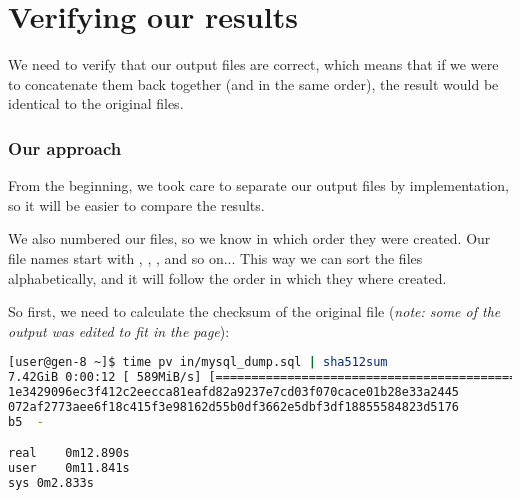 
\renewcommand{\currentPart}{Verifying our results} 

\newpage
\part{Verifying our results} \label{verify-results}

We need to verify that our output files are correct, which means that if we were to concatenate them back together (and in the same order), the result would be identical to the original files.


\section*{Our approach}

From the beginning, we took care to separate our output files by implementation, so it will be easier to compare the results. 

We also numbered our files, so we know in which order they were created. Our file names start with , , , and so on... This way we can sort the files alphabetically, and it will follow the order in which they where created.



So first, we need to calculate the checksum of the original file (\emph{note: some of the output was edited to fit in the page}):

\begin{lstlisting}[language=sh]
[user@gen-8 ~]$ time pv in/mysql_dump.sql | sha512sum
7.42GiB 0:00:12 [ 589MiB/s] [====================================================>] 100%
1e3429096ec3f412c2eecca81eafd82a9237e7cd03f070cace01b28e33a2445
072af2773aee6f18c415f3e98162d55b0df3662e5dbf3df18855584823d5176
b5  -

real	0m12.890s
user	0m11.841s
sys	0m2.833s
\end{lstlisting}

